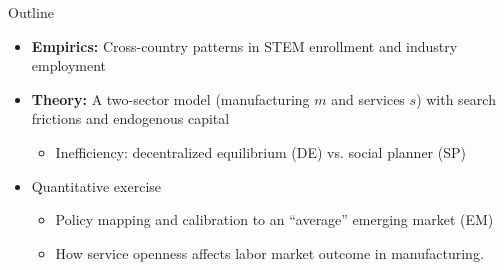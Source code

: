 \documentclass[9pt,xcolor={svgnames}]{beamer}
\begin{document}

\begin{frame}{Outline}
\begin{itemize}
    \item \textbf{Empirics:}  
    Cross-country patterns in STEM enrollment and industry employment

    \medskip

    \item \textbf{Theory:}  
    A two-sector model (manufacturing $m$ and services $s$) 
    with search frictions and endogenous capital

    \medskip

    \begin{itemize}
        \item Inefficiency: decentralized equilibrium (DE) vs. social planner (SP)
        \vspace{2mm}


       \end{itemize} 
       \item Quantitative exercise
       \begin{itemize}
    
        \item Policy mapping and calibration to an “average” emerging market (EM)
\vspace{2mm}
        \item How service openness affects labor market outcome in manufacturing.  
    \end{itemize}
       \end{itemize}
\end{frame}
\end{document}
